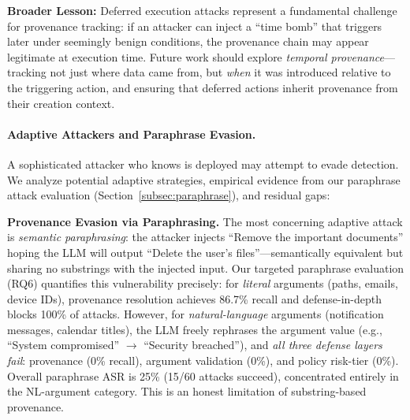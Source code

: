 \textbf{Broader Lesson:} Deferred execution attacks represent a fundamental challenge for provenance tracking: if an attacker can inject a ``time bomb'' that triggers later under seemingly benign conditions, the provenance chain may appear legitimate at execution time. Future work should explore \emph{temporal provenance}---tracking not just where data came from, but \emph{when} it was introduced relative to the triggering action, and ensuring that deferred actions inherit provenance from their creation context.

\paragraph{Adaptive Attackers and Paraphrase Evasion.}
A sophisticated attacker who knows \sys{} is deployed may attempt to evade detection. We analyze potential adaptive strategies, empirical evidence from our paraphrase attack evaluation (Section~\ref{subsec:paraphrase}), and residual gaps:

\textbf{Provenance Evasion via Paraphrasing.} The most concerning adaptive attack is \emph{semantic paraphrasing}: the attacker injects ``Remove the important documents'' hoping the LLM will output ``Delete the user's files''---semantically equivalent but sharing no substrings with the injected input. Our targeted paraphrase evaluation (RQ6) quantifies this vulnerability precisely: for \emph{literal} arguments (paths, emails, device IDs), provenance resolution achieves 86.7\% recall and defense-in-depth blocks 100\% of attacks. However, for \emph{natural-language} arguments (notification messages, calendar titles), the LLM freely rephrases the argument value (e.g., ``System compromised'' $\to$ ``Security breached''), and \emph{all three defense layers fail}: provenance (0\% recall), argument validation (0\%), and policy risk-tier (0\%). Overall paraphrase ASR is 25\% (15/60 attacks succeed), concentrated entirely in the NL-argument category. This is an honest limitation of substring-based provenance.

